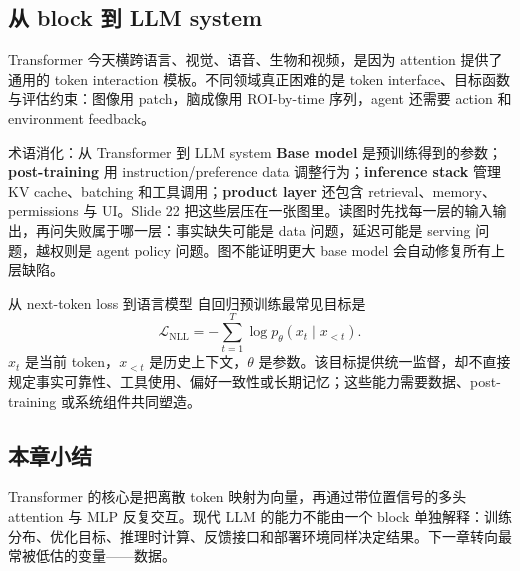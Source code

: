 \subsection{从 block 到 LLM system}

Transformer 今天横跨语言、视觉、语音、生物和视频，是因为 attention 提供了通用的 token interaction 模板。不同领域真正困难的是 token interface、目标函数与评估约束：图像用 patch，脑成像用 ROI-by-time 序列，agent 还需要 action 和 environment feedback。





\begin{knowledgebox}{术语消化：从 Transformer 到 LLM system}
\textbf{Base model} 是预训练得到的参数；\textbf{post-training} 用 instruction/preference data 调整行为；\textbf{inference stack} 管理 KV cache、batching 和工具调用；\textbf{product layer} 还包含 retrieval、memory、permissions 与 UI。Slide 22 把这些层压在一张图里。读图时先找每一层的输入输出，再问失败属于哪一层：事实缺失可能是 data 问题，延迟可能是 serving 问题，越权则是 agent policy 问题。图不能证明更大 base model 会自动修复所有上层缺陷。
\end{knowledgebox}


\begin{knowledgebox}{从 next-token loss 到语言模型}
自回归预训练最常见目标是
\[
\mathcal{L}_{\text{NLL}}=-\sum_{t=1}^{T}\log p_{\theta}(x_t\mid x_{<t}).
\]
$x_t$ 是当前 token，$x_{<t}$ 是历史上下文，$\theta$ 是参数。该目标提供统一监督，却不直接规定事实可靠性、工具使用、偏好一致性或长期记忆；这些能力需要数据、post-training 或系统组件共同塑造。
\end{knowledgebox}

\subsection{本章小结}

Transformer 的核心是把离散 token 映射为向量，再通过带位置信号的多头 attention 与 MLP 反复交互。现代 LLM 的能力不能由一个 block 单独解释：训练分布、优化目标、推理时计算、反馈接口和部署环境同样决定结果。下一章转向最常被低估的变量——数据。

